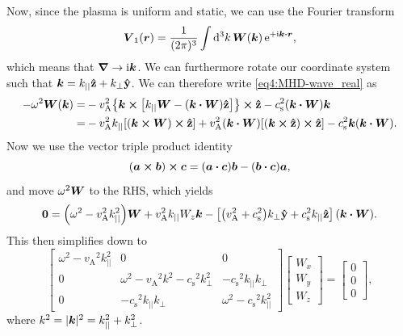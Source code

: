 \documentclass[11pt,a4paper, 
swedish, english %
]{article}
\newcommand{\vA}{\ensuremath{v_{\text{A}}}}
\newcommand{\cs}{\ensuremath{c_{\text{s}}}}
\begin{document}
Now, since the plasma is uniform and static, we can use the Fourier
transform
\begin{equation}
\vb*V_1(\vb*r)=\frac{1}{(2\pi)^3}
\int \rd^3k\, \vb*W(\vb*k)\,\ee^{+\ii\vb*k\vdot\vb*r},
\end{equation}
which means that $\grad\to\mathrm{i}\vb*k$. We can furthermore rotate our
coordinate system such that $\vb*k=k_{||}\vu{z}+k_\perp\vu{y}$. We
can therefore write \eqref{eq4:MHD-wave_real} as
\begin{equation}
\begin{aligned}
-\omega^2\vb*W(\vb*k)
=&-\vA^2\qty{\vb*k\cross\qty[k_{||}\vb*W 
- (\vb*k\vdot\vb*W)\vu{z}]}\cross\vu{z}
-\cs^2 (\vb*k\vdot\vb*W)\vb*k\\
=&-\vA^2k_{||}[(\vb*k\cross\vb*W)\cross\vu{z}]
+\vA^2(\vb*k\vdot\vb*W)[(\vb*k\cross\vu{z})\cross\vu{z}]
-\cs^2 \vb*k(\vb*k\vdot\vb*W).
\end{aligned}
\end{equation}
Now we use the vector triple product identity
\begin{equation}
(\vb*a\cross\vb*b)\cross\vb*c=
(\vb*a\vdot\vb*c)\vb*b
-(\vb*b\vdot\vb*c)\vb*a,
\end{equation}
and move $\omega^2\vb*W$ to the RHS, which yields
\begin{equation}
\vb0=
\qty(\omega^2-\vA^2k_{||}^2)\vb*W+\vA^2k_{||}W_z\vb*k
-\qty[\qty(\vA^2+\cs^2)k_\perp\vu{y}+\cs^2k_{||}\vu{z}
](\vb*k\vdot\vb*W).
\end{equation}
This then simplifies down to
\begin{equation}\label{eq:MHD-unif-disp}
\begin{bmatrix}
\omega^2-\vA^2k_{||}^2 & 0 & 0 \\
0 & \omega^2-\vA^2k^2-\cs^2k_\perp^2 & -\cs^2k_{||}k_\perp\\
0 & -\cs^2k_{||}k_\perp & \omega^2 -\cs^2k_{||}^2
\end{bmatrix}
\begin{bmatrix}
W_x\\W_y\\W_z
\end{bmatrix}
=
\begin{bmatrix}
0\\0\\0
\end{bmatrix},
\end{equation}
where $k^2=|\vb*k|^2=k_{||}^2+k_\perp^2$. 
\end{document}
